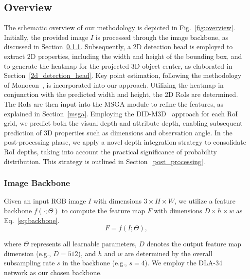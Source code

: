 \documentclass[journal]{IEEEtran}
\begin{document}
	\subsection{Overview}
	The schematic overview of our methodology is depicted in Fig.~\ref{fig:overview}. Initially, the provided image $I$ is processed through the image backbone, as discussed in Section~\ref{backbone}. Subsequently, a 2D detection head is employed to extract 2D properties, including the width and height of the bounding box, and to generate the heatmap for the projected 3D object center, as elaborated in Section~\ref{2d_detection_head}. Key point estimation, following the methodology of Monocon~\cite{monocon}, is incorporated into our approach. Utilizing the heatmap in conjunction with the predicted width and height, the 2D RoIs are determined. The RoIs are then input into the MSGA module to refine the features, as explained in Section~\ref{msga}. Employing the DID-M3D~\cite{didm3d} approach for each RoI grid, we predict both the visual depth and attribute depth, enabling subsequent prediction of 3D properties such as dimensions and observation angle. In the post-processing phase, we apply a novel depth integration strategy to consolidate RoI depths, taking into account the practical significance of probability distribution. This strategy is outlined in Section~\ref{post_processing}.
	
	\subsubsection{Image Backbone}\label{backbone}
	Given an input RGB image $I$ with dimensions $3 \times H \times W$, we utilize a feature backbone $f(\cdot; \Theta)$ to compute the feature map $F$ with dimensions $D \times h \times w$ as Eq.~\eqref{eq:backbone}.
	\begin{equation}
		F = f(I;\Theta)
		\label{eq:backbone}, 
	\end{equation}
	
	where $\Theta$ represents all learnable parameters, $D$ denotes the output feature map dimension (e.g., $D=512$), and $h$ and $w$ are determined by the overall subsampling rate $s$ in the backbone (e.g., $s=4$). We employ the DLA-34~\cite{dla} network as our chosen backbone.
	
\end{document}

